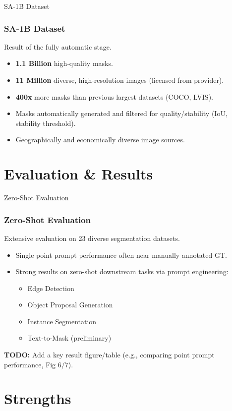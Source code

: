 \documentclass{beamer}
\begin{document}
\begin{frame}{SA-1B Dataset}
    \frametitle{SA-1B Dataset}
    Result of the fully automatic stage.
    \begin{itemize}
        \item \textbf{1.1 Billion} high-quality masks.
        \item \textbf{11 Million} diverse, high-resolution images (licensed from provider).
        \item \textbf{400x} more masks than previous largest datasets (COCO, LVIS).
        \item Masks automatically generated and filtered for quality/stability (IoU, stability threshold).
        \item Geographically and economically diverse image sources.
    \end{itemize}
\end{frame}

\section{Evaluation & Results}

\begin{frame}{Zero-Shot Evaluation}
    \frametitle{Zero-Shot Evaluation}
    Extensive evaluation on 23 diverse segmentation datasets.
    \begin{itemize}
        \item Single point prompt performance often near manually annotated GT.
        \item Strong results on zero-shot downstream tasks via prompt engineering:
        \begin{itemize}
            \item Edge Detection
            \item Object Proposal Generation
            \item Instance Segmentation
            \item Text-to-Mask (preliminary)
        \end{itemize}
    \end{itemize}
    \vfill
    \textbf{TODO:} Add a key result figure/table (e.g., comparing point prompt performance, Fig 6/7).
\end{frame}

\section{Strengths}
\end{document}
